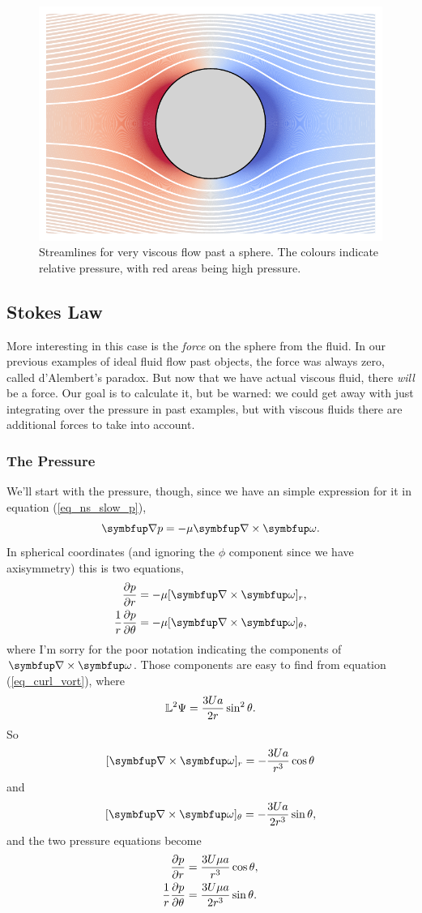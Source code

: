 \begin{figure}
\centering
\includegraphics[width=0.8\linewidth]{Figures/Chapter6/fig_sphere_viscous_lines}
\caption{Streamlines for very viscous flow past a sphere.  The colours indicate relative pressure, with red areas being high pressure.}
\label{fig_sphere_viscous_lines}
\end{figure}

\subsection{Stokes Law}

More interesting in this case is the \emph{force} on the sphere from the fluid.  In our previous examples of ideal fluid flow past objects, the force was always zero, called d'Alembert's paradox.  But now that we have actual viscous fluid, there \emph{will} be a force.  Our goal is to calculate it, but be warned:  we could get away with just integrating over the pressure in past examples, but with viscous fluids there are additional forces to take into account.

\subsubsection{The Pressure}

We'll start with the pressure, though, since we have an simple expression for it in equation (\ref{eq_ns_slow_p}),
\[
\grad p = -\mu \grad \times \vec{\omega}.
\]
In spherical coordinates (and ignoring the $\phi$ component since we have axisymmetry) this is two equations,
\begin{align}
\dfdx{p}{r} & = -\mu [\grad \times \vec{\omega}]_r, \\
\frac{1}{r}\dfdx{p}{\theta} & = -\mu [\grad \times \vec{\omega}]_\theta,
\end{align}
where I'm sorry for the poor notation indicating the components of $\grad \times \vec{\omega}$.  Those components are easy to find from equation (\ref{eq_curl_vort}), where
\[
\mathbb{L}^2 \Psi = \frac{3Ua}{2r} \sin^2\theta.
\]
So 
\[
[\grad \times \vec{\omega}]_r = -\frac{3Ua}{r^3} \cos\theta
\]
and
\[
[\grad \times \vec{\omega}]_\theta = -\frac{3Ua}{2r^3} \sin\theta,
\]
and the two pressure equations become
\begin{align}
\frac{\partial {p}}{\partial {r}} & =  \frac{3U\mu a}{r^3} \cos\theta, \\
\frac{1}{r}\frac{\partial {p}}{\partial {\theta}} & = \frac{3U\mu a}{2r^3} \sin\theta.
\end{align}


